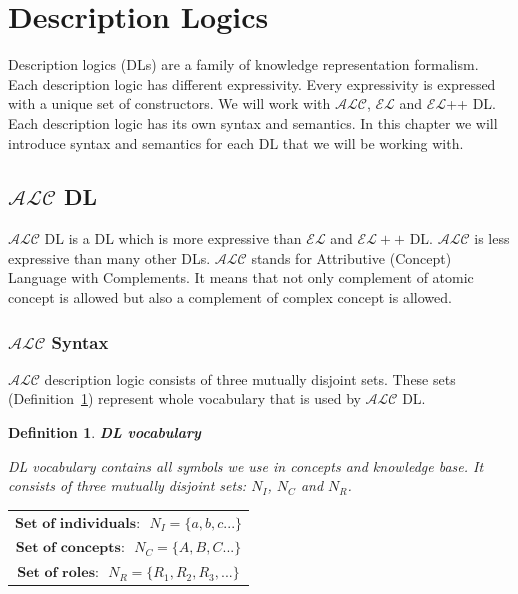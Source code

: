 \documentclass[12pt,a4paper]{article}
\newtheorem{definition}{Definition}[subsection]
\begin{document}
\pagebreak
\section{Description Logics}
Description logics (DLs) are a family of knowledge representation formalism. Each description logic has different expressivity. Every expressivity is expressed with a unique set of constructors. We will work with $\mathcal{ALC}$, $\mathcal{EL}$ and $\mathcal{EL}${+}{+} DL. Each description logic has its own syntax and semantics. In this chapter we will introduce syntax and semantics \citep{Rudolph2011} for each DL that we will be working with.

\subsection{$\mathcal{ALC}$ DL}
$\mathcal{ALC}$ DL is a DL which is more expressive than $\mathcal{EL}$ and $\mathcal{EL}{+}{+}$ DL. $\mathcal{ALC}$ is less expressive than many other DLs. $\mathcal{ALC}$ stands for Attributive (Concept) Language with Complements. It means that not only complement of atomic concept is allowed but also a complement of complex concept is allowed.

\subsubsection{$\mathcal{ALC}$ Syntax}
$\mathcal{ALC}$ description logic consists of three mutually disjoint sets. These sets (Definition~\ref{def:DLVocabulary}) represent whole vocabulary that is used by $\mathcal{ALC}$ DL.

\begin{definition}{\textbf{DL vocabulary}}
	\label{def:DLVocabulary}
	
	DL vocabulary contains all symbols we use in concepts and knowledge base. It consists of three mutually disjoint sets: $N_{I}$, $N_{C}$ and $N_{R}$. 
	
	\begin{table}[H]
		\centering
		\begin{tabular}{c}
			$ \textbf{Set of individuals:} \text{ } N_{I} = \{a,b,c...\} $ \\
			\addlinespace[0.4cm]
			$ \textbf{Set of concepts:} \text{ } N_{C} = \{A,B,C...\} $ \\
			\addlinespace[0.4cm]
			$ \textbf{Set of roles:} \text{ } N_{R} = \{R_{1},R_{2},R_{3},...\} $			
		\end{tabular}
	\end{table}		
		
\end{definition}
\end{document}
